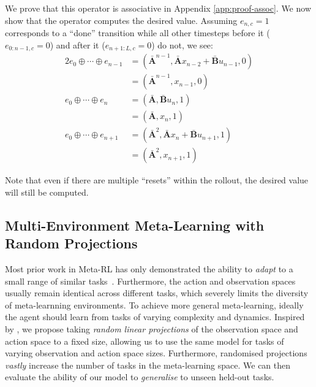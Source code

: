 \documentclass{article}
\newcommand{\newop}{\oplus}
\begin{document}
We prove that this operator is associative in Appendix \ref{app:proof-assoc}. We now show that the operator computes the desired value. Assuming $e_{n,c}=1$ corresponds to a ``done'' transition while all other timesteps before it ($e_{0:n-1,c}=0$) and after it ($e_{n+1:L,c}=0$) do not, we see:
\begin{alignat}{2}
e_0 \newop \cdots \newop e_{n-1} &= (\mathbf{\bar{A}}^{n-1}, \mathbf{\bar{A}} x_{n-2}+ \mathbf{\bar{B}}u_{n-1}, 0) \nonumber \\ \nonumber
&= (\mathbf{\bar{A}}^{n-1}, x_{n-1}, 0)\\ \nonumber
e_0 \newop \cdots \newop e_n &= (\mathbf{\bar{A}}, \mathbf{\bar{B}}u_n, 1) \\ \nonumber 
&= (\mathbf{\bar{A}}, x_n, 1)\\ \nonumber
e_0 \newop \cdots \newop e_{n+1} &= (\mathbf{\bar{A}}^2, \mathbf{\bar{A}} x_n + \mathbf{\bar{B}}u_{n+1}, 1) \\ \nonumber
&= (\mathbf{\bar{A}}^2, x_{n+1}, 1)
\end{alignat}

Note that even if there are multiple ``resets'' within the rollout, the desired value will still be computed. 



\subsection{Multi-Environment Meta-Learning with Random Projections}
\label{subsec:memlrp}

Most prior work in Meta-RL has only demonstrated the ability to \textit{adapt} to a small range of similar tasks~\citep{beck2023survey}. Furthermore, the action and observation spaces usually remain identical across different tasks, which severely limits the diversity of meta-learnning environments. To achieve more general meta-learning, ideally the agent should learn from tasks of varying complexity and dynamics. Inspired by \citet{kirsch2022general}, we propose taking \textit{random linear projections} of the observation space and action space to a fixed size, allowing us to use the same model for tasks of varying observation and action space sizes. Furthermore, randomised projections \textit{vastly} increase the number of tasks in the meta-learning space. We can then evaluate the ability of our model to \textit{generalise} to unseen held-out tasks.
\end{document}
